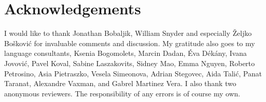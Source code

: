 \documentclass[output=paper,colorlinks,citecolor=brown,
]{langscibook}
\begin{document}
\section*{Acknowledgements}
I would like to thank Jonathan Bobaljik, William Snyder and especially Željko Bošković for invaluable comments and discussion. My gratitude also goes to my language consultants, Ksenia Bogomolets, Marcin Dadan, Éva Dékány, Ivana Jovović, Pavel Koval, Sabine Laszakovits, Sidney Mao, Emma Nguyen, Roberto Petrosino, Asia Pietraszko, Vesela Simeonova, Adrian Stegovec, Aida Talić, Panat Taranat, Alexandre Vaxman, and Gabrel Martinez Vera. I also thank two anonymous reviewers. The responsibility of any errors is of course my own.

\printbibliography[heading=subbibliography,notkeyword=this]
\end{document}
